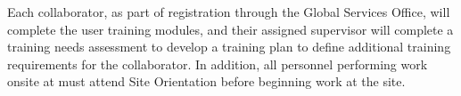 Each  collaborator, as part of registration through the \fnal Global Services Office,
will complete the user  training modules, and their assigned supervisor
will complete a training needs assessment to develop a training plan
to define additional   training requirements for the collaborator.
In addition, all personnel performing work onsite at  must
attend   Site Orientation before beginning work at the site.
\begin{comment}
All work activities
shall be subject to work planning and hazard analysis. 
Work planning ensures the scope of
the job is understood, appropriate materials are available, all
hazards have been identified, mitigation efforts established, and all
affected employees understand what is expected of them.   
All work planning documentation will be reviewed and
approved by the \dword{dune} \dword{esh} coordinator and the \dword{dune}
\dword{esh} review committee before beginning work activities.

A safety data sheet must be supplied for all chemicals and
hazardous materials used on site. All chemicals and hazardous
materials brought to the \dword{surf} site must be reviewed/approved by the
\dword{dune} \dword{esh} coordinator and the \dword{surf} \dword{esh}
department before arriving on site.

An emergency management program will be in place that incorporates an \dword{ert},  trained guides on all underground levels during all shifts, and protocols for treating injuries, accidents, or spills.

Fire and life safety requirements for \dword{lbnf-dune} areas
were analyzed in the \dword{lbnf-dune} Far Site Fire and Life
Safety Assessment. All caverns will be equipped with fire detection
and suppression systems with both visual and auditory notification.  
\dword{surf} will monitor all fire alarms and system supervisory signals, and the \dword{surf} \dword{ert}. 
will respond to the signals, with additional support from the local Lead-Deadwood Fire
Department as needed.  The caverns will also be equipped
with an \dword{odh} monitoring and alarm system with independent visual and
auditory notification systems.


All workers on the \dword{dune} project have the
authority to stop work in any situation that presents an imminent
threat to safety, health, and the environment. Work may not resume
until the circumstances are investigated and deficiencies corrected,
including the concurrence of the \dword{dune} \dword{ipd}
and the \dword{lbnf-dune} \dword{esh} manager.
\end{comment}

